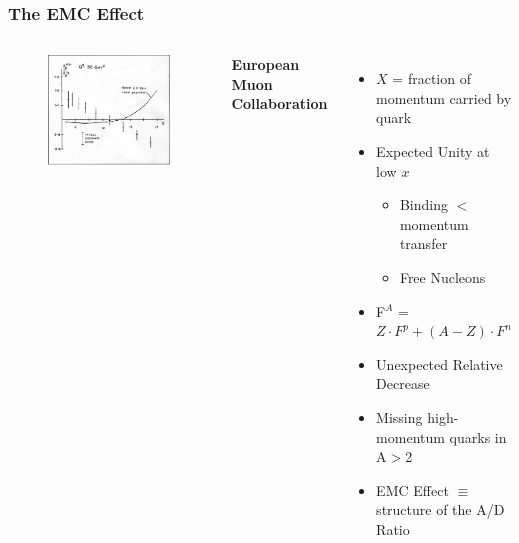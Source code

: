 \documentclass[12pt,usenames,dvipsnames]{beamer}
\begin{document}
\begin{frame}
\frametitle{The EMC Effect}
\begin{columns}[t]
	\vspace{-35pt}
	\begin{figure}
		\includegraphics[width =7cm]{../images/Thesis/EMC.png}
		\caption*{\cite{cc}}
	\end{figure}
	
	\vspace{-1.25cm}	\hspace{-20pt}\textbf{ European Muon Collaboration}
	
	\begin{itemize}
		\item \small$X$ = fraction of momentum carried by quark	
		\item Expected Unity at low $x$ 
		\begin{itemize}
			\item Binding $<$ momentum transfer
			\item Free Nucleons
		\end{itemize}
		\item F$^A$ = $Z \cdot F^p + (A-Z)\cdot F^n$  
		\item Unexpected Relative Decrease
		\item Missing high-momentum quarks in A$>$2
		\item EMC Effect $\equiv$ structure of the A/D Ratio
	\end{itemize}
	
\end{columns}
\end{frame}
\end{document}
